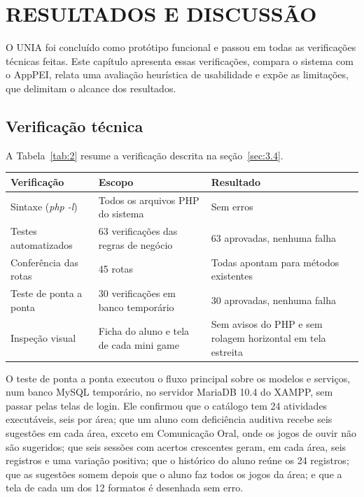 
\chapter{RESULTADOS E DISCUSSÃO}\label{cap:5}

O UNIA foi concluído como protótipo funcional e passou em todas as verificações técnicas feitas. Este capítulo apresenta essas verificações, compara o sistema com o AppPEI, relata uma avaliação heurística de usabilidade e expõe as limitações, que delimitam o alcance dos resultados.

\section{Verificação técnica}\label{sec:5.1}

A Tabela~\ref{tab:2} resume a verificação descrita na seção~\ref{sec:3.4}.

\begin{tabelacurta}
\setlength{\largtab}{\dimexpr\linewidth-6\tabcolsep-0\arrayrulewidth-1pt\relax}
\label{tab:2}\vspace{4pt}
\begin{tabular}{L{0.2655}L{0.3326}L{0.4019}}
\hline
\textbf{Verificação} & \textbf{Escopo} & \textbf{Resultado} \\
\hline
Sintaxe (\textit{php -l}) & Todos os arquivos PHP do sistema & Sem erros \\
Testes automatizados & 63 verificações das regras de negócio & 63 aprovadas, nenhuma falha \\
Conferência das rotas & 45 rotas & Todas apontam para métodos existentes \\
Teste de ponta a ponta & 30 verificações em banco temporário & 30 aprovadas, nenhuma falha \\
Inspeção visual & Ficha do aluno e tela de cada mini game & Sem avisos do PHP e sem rolagem horizontal em tela estreita \\
\hline
\end{tabular}
\end{tabelacurta}

O teste de ponta a ponta executou o fluxo principal sobre os modelos e serviços, num banco MySQL temporário, no servidor MariaDB 10.4 do XAMPP, sem passar pelas telas de login. Ele confirmou que o catálogo tem 24 atividades executáveis, seis por área; que um aluno com deficiência auditiva recebe seis sugestões em cada área, exceto em Comunicação Oral, onde os jogos de ouvir não são sugeridos; que seis sessões com acertos crescentes geram, em cada área, seis registros e uma variação positiva; que o histórico do aluno reúne os 24 registros; que as sugestões somem depois que o aluno faz todos os jogos da área; e que a tela de cada um dos 12 formatos é desenhada sem erro.

